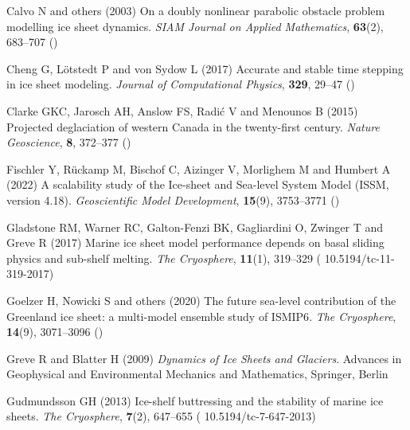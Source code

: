 \documentclass[review]{igs}
\begin{document}
\begin{thebibliography}{34}
Calvo N and others (2003) On a doubly nonlinear parabolic obstacle problem
  modelling ice sheet dynamics. \emph{SIAM Journal on Applied Mathematics},
  \textbf{63}(2), 683--707 ()

Cheng G, L{\"o}tstedt P and von Sydow L (2017) Accurate and stable time
  stepping in ice sheet modeling. \emph{Journal of Computational Physics},
  \textbf{329}, 29--47 ()

Clarke GKC, Jarosch AH, Anslow FS, Radić V and Menounos B (2015) Projected
  deglaciation of western {C}anada in the twenty-first century. \emph{Nature
  Geoscience}, \textbf{8}, 372--377 ()

Fischler Y, R\"uckamp M, Bischof C, Aizinger V, Morlighem M and Humbert A
  (2022) A scalability study of the {Ice-sheet and Sea-level System Model}
  ({ISSM}, version 4.18). \emph{Geoscientific Model Development},
  \textbf{15}(9), 3753--3771 ()

Gladstone RM, Warner RC, Galton-Fenzi BK, Gagliardini O, Zwinger T and Greve R
  (2017) Marine ice sheet model performance depends on basal sliding physics
  and sub-shelf melting. \emph{The Cryosphere}, \textbf{11}(1), 319--329 (\doi
  {10.5194/tc-11-319-2017})

Goelzer H, Nowicki S and others (2020) The future sea-level contribution of the
  {G}reenland ice sheet: a multi-model ensemble study of {ISMIP6}. \emph{The
  Cryosphere}, \textbf{14}(9), 3071--3096 ()

Greve R and Blatter H (2009) \emph{Dynamics of {I}ce {S}heets and {G}laciers}.
  Advances in Geophysical and Environmental Mechanics and Mathematics,
  Springer, Berlin

Gudmundsson GH (2013) Ice-shelf buttressing and the stability of marine ice
  sheets. \emph{The Cryosphere}, \textbf{7}(2), 647--655 (\doi
  {10.5194/tc-7-647-2013})


\end{thebibliography}
\end{document}
